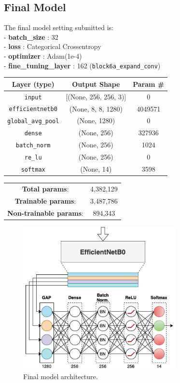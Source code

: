 \documentclass[conference,compsoc]{IEEEtran}
\begin{document}
\subsection{Final Model}
The final model setting submitted is: \\
- \textbf{batch\_size} : 32 \\
- \textbf{loss} : Categorical Crossentropy \\
- \textbf{optimizer} : Adam(1e-4) \\
- \textbf{fine\_tuning\_layer} : 162 (\texttt{block6a\_expand\_conv})
\begin{center}
\begin{tabular}{ c | c c }
\hline
  \textbf{Layer (type)} & \textbf{Output Shape} & \textbf{Param #} \\ 
\hline\hline
 \texttt{input} & [(None, 256, 256, 3)] & 0  \\
 \texttt{efficientnetb0} & (None, 8, 8, 1280) & 4049571  \\  
 \texttt{global\_avg\_pool} & (None, 1280) & 0 \\
 \texttt{dense} & (None, 256) & 327936 \\
 \texttt{batch\_norm} & (None, 256) & 1024 \\
 \texttt{re\_lu}  & (None, 256) & 0 \\
 \texttt{softmax} & (None, 14) & 3598 \\
\hline\hline
\end{tabular}
\end{center}
\begin{center}
\begin{tabular}{ c c }
\textbf{Total params}: & 4,382,129 \\
\textbf{Trainable params}: & 3,487,786 \\
\textbf{Non-trainable params}: & 894,343 \\
\hline
\end{tabular}
\end{center}

\begin{figure}[h!]
\centering
\includegraphics[width=3.3in]{img/final.png}
\caption{Final model architecture.}
\label{fig_sim}
\end{figure}
\end{document}
